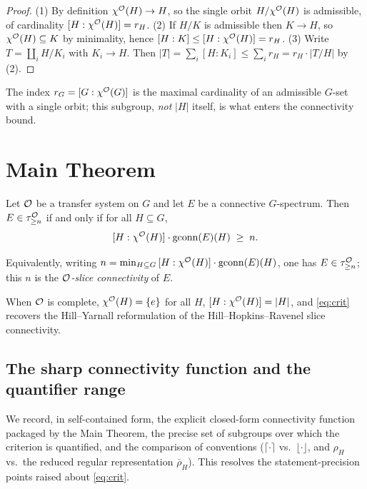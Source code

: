 \begin{proof}
(1) By definition $\chi^{\mathcal{O}}(H)\to H$, so the single orbit $H/\chi^{\mathcal{O}}(H)$ is
admissible, of cardinality $[H:\chi^{\mathcal{O}}(H)]=r_H$.
(2) If $H/K$ is admissible then $K\to H$, so $\chi^{\mathcal{O}}(H)\subseteq K$ by
minimality, hence $[H:K]\le[H:\chi^{\mathcal{O}}(H)]=r_H$.
(3) Write $T=\coprod_i H/K_i$ with $K_i\to H$. Then
$|T|=\sum_i[H:K_i]\le \sum_i r_H = r_H\cdot|T/H|$ by (2).
\end{proof}

The index $r_G=[G:\chi^{\mathcal{O}}(G)]$ is the maximal cardinality of an admissible $G$-set
with a single orbit; this subgroup, \emph{not} $|H|$ itself, is what enters the
connectivity bound.

\section*{Main Theorem}

\begin{qfivetheorem}\label{thm:main}
Let $\mathcal{O}$ be a transfer system on $G$ and let $E$ be a connective $G$-spectrum.
Then $E\in\tau^{\mathcal{O}}_{\ge n}$ if and only if for all $H\subseteq G$,
\begin{equation}\label{eq:crit}
[H:\chi^{\mathcal{O}}(H)]\cdot\operatorname{gconn}(E)(H)\;\ge\;n .
\end{equation}
\end{qfivetheorem}

Equivalently, writing
$n=\min_{H\subseteq G}\,[H:\chi^{\mathcal{O}}(H)]\cdot\operatorname{gconn}(E)(H)$, one has
$E\in\tau^{\mathcal{O}}_{\ge n}$; this $n$ is the \emph{$\mathcal{O}$-slice connectivity} of $E$.

When $\mathcal{O}$ is complete, $\chi^{\mathcal{O}}(H)=\{e\}$ for all $H$, $[H:\chi^{\mathcal{O}}(H)]=|H|$,
and \eqref{eq:crit} recovers the Hill--Yarnall reformulation \cite{HY18} of the
Hill--Hopkins--Ravenel slice connectivity.

\subsection*{The sharp connectivity function and the quantifier range}

We record, in self-contained form, the explicit closed-form connectivity
function packaged by the Main Theorem, the precise set of subgroups over which
the criterion is quantified, and the comparison of conventions
($\lceil\cdot\rceil$ vs.\ $\lfloor\cdot\rfloor$, and $\rho_H$ vs.\ the reduced
regular representation $\bar\rho_H$). This resolves the statement-precision
points raised about \eqref{eq:crit}.

